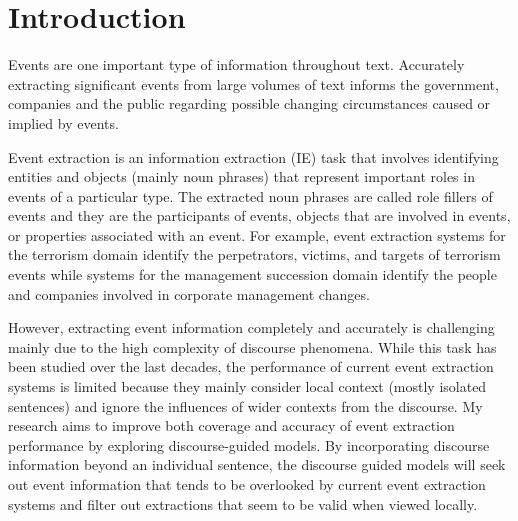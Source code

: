 \chapter{Introduction}
\label{Chapter:Introduction}

Events are one important type of information throughout text. 
Accurately extracting significant events from large volumes of text 
informs the government, companies and the public regarding possible
 changing circumstances caused or implied by events. 


Event extraction is an information extraction (IE)
task that involves identifying 
entities and objects (mainly noun phrases) that represent 
important roles in
events 
of a particular type. The extracted noun phrases are called role fillers of events and 
they are the participants of events, objects that are involved in events, or properties 
associated with an event. For example, event extraction
systems for the terrorism domain identify
the perpetrators, victims, and targets of terrorism
events while systems for the management succession domain identify
the people and companies involved in corporate
management changes. 

However, extracting event information completely and accurately is challenging 
mainly due to the high complexity of discourse phenomena.
While this task has been studied over the last decades,  
 the performance of current event extraction systems is limited 
because they mainly consider local context 
(mostly isolated sentences) and ignore the influences of wider contexts 
from the discourse. 
My research aims to improve both coverage and accuracy of event extraction performance 
by exploring discourse-guided models. By incorporating discourse information 
beyond an individual sentence, the discourse guided models will seek out 
event information that tends to be overlooked by current event extraction systems 
and filter out extractions that seem to be valid when viewed locally.  

